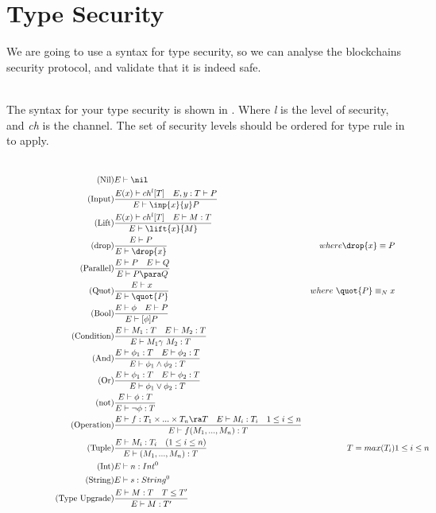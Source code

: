 \section{Type Security}
We are going to use a syntax for type security, so we can analyse the blockchains security protocol, and validate that it is indeed safe.\\\\




The syntax for your type security is shown in . Where \textit{l} is the level of security, and \textit{ch} is the channel. The set of security levels should be ordered for type rule in   to apply.\\\\


\begin{figure}
\begin{align}
\tag{Nil} &E \vdash \nil\\
\tag{Input} &\frac{E(x) \vdash ch^l[T]\quad E,y:T\vdash P}{E \vdash \inp{x}{y}P}\\
\tag{Lift} &\frac{E(x) \vdash ch^l[T] \quad E \vdash M:T}{E\vdash \lift{x}{M}}\\
\tag{drop} &\frac{E \vdash P}{E\vdash \drop{x}}& where \drop{x} \equiv P\\
\tag{Parallel} &\frac{E\vdash P \quad E \vdash Q}{E \vdash P \para Q}\\
\tag{Quot} &\frac{E \vdash x}{E\vdash \quot{P}}& where\ \quot{P} \equiv_N x\\
\tag{Bool} &\frac{E\vdash \phi \quad E\vdash P}{E \vdash [\phi] P}\\
\tag{Condition} &\frac{E\vdash M_1:T \quad E\vdash M_2:T}{E\vdash M_1 \gamma\ M_2:T}\\
\tag{And} &\frac{E\vdash \phi _1:T \quad E\vdash \phi _2:T}{E\vdash \phi _1 \land \phi _2:T}\\
\tag{Or} &\frac{E\vdash \phi _1:T \quad E\vdash \phi _2:T}{E\vdash \phi _1 \lor \phi _2:T}\\
\tag{not} &\frac{E\vdash \phi :T }{E\vdash \neg \phi :T}\\
\tag{Operation} &\frac{E\vdash f:T_1\times ... \times T_n\ra T\quad E\vdash M_i:T_i\quad 1\leq i \leq n}{E\vdash f(M_1,...,M_n):T}\\
\tag{Tuple} &\frac{E\vdash M_i:T_i \quad (1\leq i\leq n)}{E\vdash (M_1,...,M_n):T}&T = max(T_i)& 1\leq i\leq n\\
\tag{Int} &E\vdash n: Int^0\\
\tag{String} &E\vdash s:String^0\\
\tag{Type Upgrade} &\frac{E\vdash M:T \quad T\leq T'}{E\vdash M:T'}\end{align}
\end{figure}

